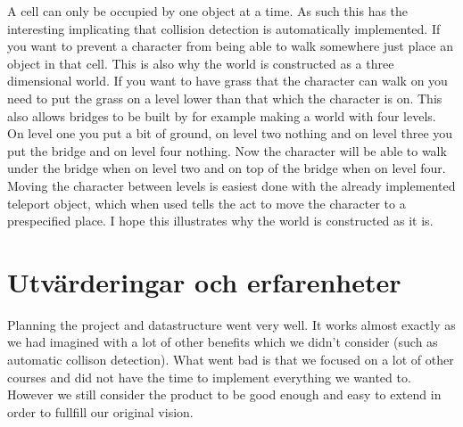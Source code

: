 \documentclass[12pt,a4paper]{article}
\begin{document}
A cell can only be occupied by one object at a time. As such this has the interesting implicating that collision detection is automatically implemented. If you want to prevent a character from being able to walk somewhere just place an object in that cell. This is also why the world is constructed as a three dimensional world. If you want to have grass that the character can walk on you need to put the grass on a level lower than that which the character is on. This also allows bridges to be built by for example making a world with four levels. On level one you put a bit of ground, on level two nothing and on level three you put the bridge and on level four nothing.
Now the character will be able to walk under the bridge when on level two and on top of the bridge when on level four. Moving the character between levels is easiest done with the already implemented teleport object, which when used tells the act to move the character to a prespecified place.
I hope this illustrates why the world is constructed as it is.




\section{Utvärderingar och erfarenheter}


Planning the project and datastructure went very well. It works almost exactly as we had imagined with a lot of other benefits which we didn't consider (such as automatic collison detection). What went bad is that we focused on a lot of other courses and did not have the time to implement everything we wanted to. However we still consider the product to be good enough and easy to extend in order to fullfill our original vision.
\end{document}
